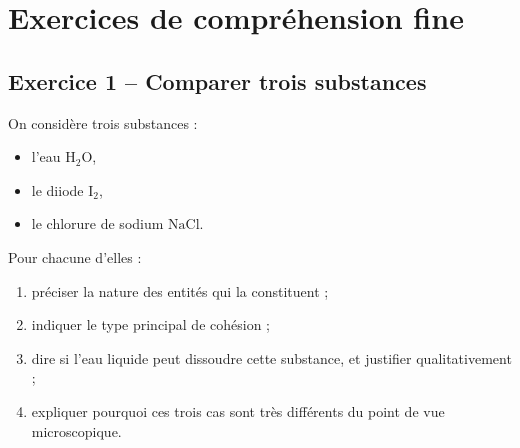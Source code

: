 \documentclass[11pt,a4paper]{article}
\begin{document}
\section{Exercices de compréhension fine}

\subsection{Exercice 1 -- Comparer trois substances}

\begin{enoncebox}
On considère trois substances :
\begin{itemize}
    \item l'eau \(\mathrm{H_2O}\),
    \item le diiode \(\mathrm{I_2}\),
    \item le chlorure de sodium \(\mathrm{NaCl}\).
\end{itemize}

Pour chacune d'elles :
\begin{enumerate}[label=\arabic*)]
    \item préciser la nature des entités qui la constituent ;
    \item indiquer le type principal de cohésion ;
    \item dire si l'eau liquide peut dissoudre cette substance, et justifier qualitativement ;
    \item expliquer pourquoi ces trois cas sont très différents du point de vue microscopique.
\end{enumerate}
\end{enoncebox}
\end{document}
